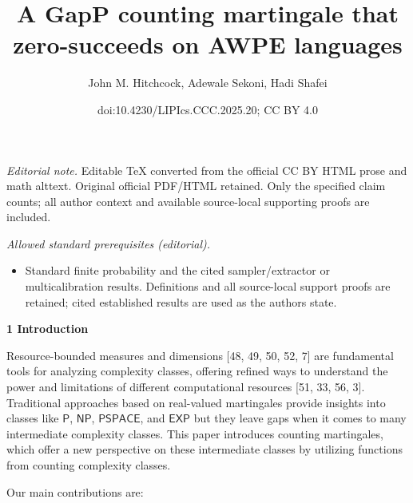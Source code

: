 \documentclass[10pt,a4paper]{article}
\title{A GapP counting martingale that zero-succeeds on AWPE languages}
\author{John M. Hitchcock, Adewale Sekoni, Hadi Shafei}
\date{doi:10.4230/LIPIcs.CCC.2025.20; CC BY 4.0}
\begin{document}
\maketitle
\noindent\textit{Editorial note.} Editable TeX converted from the official CC BY HTML prose and math alttext. Original official PDF/HTML retained. Only the specified claim counts; all author context and available source-local supporting proofs are included.\par\medskip
\noindent\textit{Allowed standard prerequisites (editorial).}\begin{itemize}
\item Standard finite probability and the cited sampler/extractor or multicalibration results. Definitions and all source-local support proofs are retained; cited established results are used as the authors state.
\end{itemize}\medskip


\par\medskip\noindent\textbf{
1 Introduction}\par




Resource-bounded measures and dimensions [48, 49, 50, 52, 7] are fundamental tools for analyzing complexity classes, offering refined ways to understand the power and limitations of different computational resources [51, 33, 56, 3].
Traditional approaches based on real-valued martingales provide insights into classes like $\mathsf{P}$, $\mathsf{NP}$, $\mathsf{PSPACE}$, and $\mathsf{EXP}$ but they leave gaps when it comes to many intermediate complexity classes. This paper introduces counting martingales, which offer a new perspective on these intermediate classes by utilizing functions from counting complexity classes.\par




Our main contributions are:\par
\end{document}
